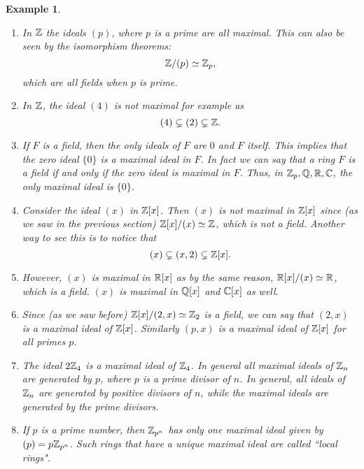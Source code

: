 \documentclass[12pt]{article}
\theoremstyle{plain}
\newtheorem{example}{Example}
\theoremstyle{definition}
\theoremstyle{remark}
\begin{document}
\begin{example}
\begin{enumerate}
    \item In $\mathbb{Z}$ the ideals $(p)$, where $p$ is a prime are all maximal. This can also be seen by the isomorphism theorems:
    $$\mathbb{Z}/(p)\simeq \mathbb{Z}_p,$$
    which are all fields when $p$ is prime.
    \item In $\mathbb{Z}$, the ideal $(4)$ is not maximal for example as
    $$(4) \subsetneq (2) \subsetneq \mathbb{Z}.$$
    \item If $F$ is a field, then the only ideals of $F$ are $0$ and $F$ itself. This implies that the zero ideal $\{0\}$ is a maximal ideal in $F$. In fact we can say that a ring $F$ is a field if and only if the zero ideal is maximal in $F$. Thus, in $\mathbb{Z}_p, \mathbb{Q}, \mathbb{R}, \mathbb{C}$, the only maximal ideal is $\{0\}$.
    \item Consider the ideal $(x)$ in $\mathbb{Z}[x]$. Then $(x)$ is not maximal in $\mathbb{Z}[x]$ since (as we saw in the previous section) $\mathbb{Z}[x]/(x)\simeq \mathbb{Z}$, which is not a field. Another way to see this is to notice that
    $$(x) \subsetneq (x,2) \subsetneq \mathbb{Z}[x].$$
    \item However, $(x)$ is maximal in $\mathbb{R}[x]$ as by the same reason, $\mathbb{R}[x]/(x)\simeq \mathbb{R}$, which is a field. $(x)$ is maximal in $\mathbb{Q}[x]$ and $\mathbb{C}[x]$ as well.
    \item Since (as we saw before) $\mathbb{Z}[x]/(2,x) \simeq \mathbb{Z}_2$ is a field, we can say that $(2,x)$ is a maximal ideal of $\mathbb{Z}[x]$. Similarly $(p,x)$ is a maximal ideal of $\mathbb{Z}[x]$ for all primes $p$.
    \item The ideal $2\mathbb{Z}_4$ is a maximal ideal of $\mathbb{Z}_4$. In general all maximal ideals of $\mathbb{Z}_n$ are generated by $p$, where $p$ is a prime divisor of $n$. In general, all ideals of $\mathbb{Z}_n$ are generated by positive divisors of $n$, while the maximal ideals are generated by the prime divisors.
    \item If $p$ is a prime number, then $\mathbb{Z}_{p^n}$ has only one maximal ideal given by $(p) = p\mathbb{Z}_{p^n}$. Such rings that have a unique maximal ideal are called ``local rings".
\end{enumerate}
\end{example}
\end{document}
